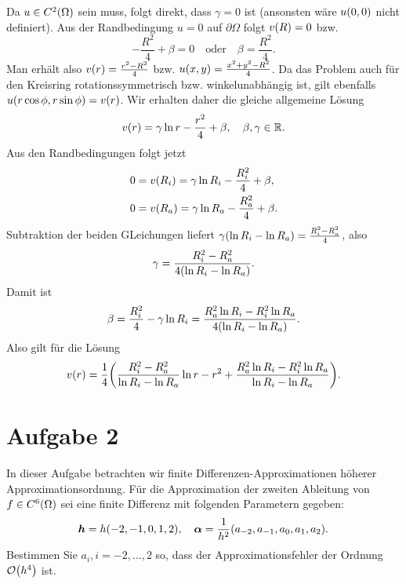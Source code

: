 \documentclass{exercise}
\begin{document}
\begin{enumerate}
\begin{enumerate}
\[            \]
        \end{enumerate}
        Da \(u \in C^2\parentheses*{\Omega}\) sein muss, folgt direkt, dass \(\gamma = 0\) ist (ansonsten wäre \(u\parentheses*{0, 0}\) nicht definiert).
        Aus der Randbedingung \(u = 0\) auf \(\partial\Omega\) folgt \(v\parentheses*{R} = 0\) bzw.
        \[
            -\frac{R^2}{4} + \beta = 0 \quad \text{oder} \quad \beta = \frac{R^2}{4}.
        \]
        Man erhält also \(v\parentheses*{r} = \frac{r^2 - R^2}{4}\) bzw. \(u\parentheses*{x, y} = \frac{x^2 + y^2 - R^2}{4}\).
        Da das Problem auch für den Kreisring rotationssymmetrisch bzw. winkelunabhängig ist, gilt ebenfalls \(u\parentheses*{r\cos\phi, r\sin\phi} = v\parentheses*{r}\).
        Wir erhalten daher die gleiche allgemeine Lösung
        \[
            v\parentheses*{r} = \gamma\ln r - \frac{r^2}{4} + \beta, \quad \beta, \gamma \in \R.
        \]
        Aus den Randbedingungen folgt jetzt
        \begin{align*}
            0 &= v\parentheses*{R_i} = \gamma\ln R_i - \frac{R_i^2}{4} + \beta,\\
            0 &= v\parentheses*{R_a} = \gamma\ln R_a - \frac{R_a^2}{4} + \beta.
        \end{align*}
        Subtraktion der beiden GLeichungen liefert \(\gamma\parentheses*{\ln R_i - \ln R_a} = \frac{R_i^2 - R_a^2}{4}\), also
        \[
            \gamma = \frac{R_i^2 - R_a^2}{4\parentheses*{\ln R_i - \ln R_a}}.
        \]
        Damit ist
        \[
            \beta = \frac{R_i^2}{4} - \gamma\ln R_i = \frac{R_a^2 \ln R_i - R_i^2 \ln R_a}{4\parentheses*{\ln R_i - \ln R_a}}.
        \]
        Also gilt für die Lösung
        \[
            v\parentheses*{r} = \frac{1}{4}\parentheses*{\frac{R_i^2 - R_a^2}{\ln R_i - \ln R_a}\ln r - r^2 + \frac{R_a^2 \ln R_i - R_i^2 \ln R_a}{\ln R_i - \ln R_a}}.
        \]
    \end{enumerate}


    \section*{Aufgabe 2}

    \begin{problem}
        In dieser Aufgabe betrachten wir finite Differenzen-Approximationen höherer Approximationsordnung.
        Für die Approximation der zweiten Ableitung von \(f \in C^6\parentheses*{\Omega}\) sei eine finite Differenz mit folgenden Parametern gegeben:
        \[
            \bm{h} = h\parentheses*{-2, -1, 0, 1, 2}, \quad \bm{\alpha} = \frac{1}{h^2}\parentheses*{a_{-2}, a_{-1}, a_0, a_1, a_2}.
        \]
        Bestimmen Sie \(a_i, i = -2, \ldots, 2\) so, dass der Approximationsfehler der Ordnung \(\mathcal{O}\parentheses*{h^4}\) ist.
    \end{problem}
\end{document}
